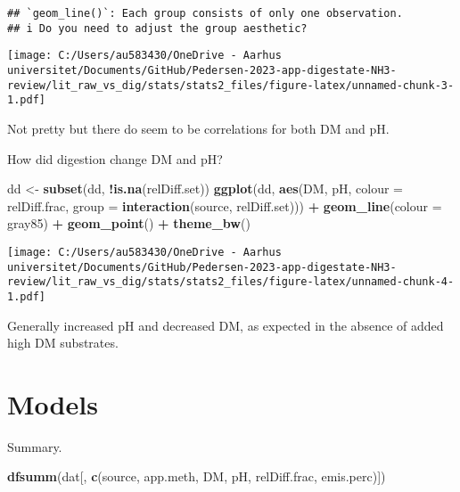 \documentclass[
]{article}
\newenvironment{Shaded}{\begin{snugshade}}{\end{snugshade}}
\newcommand{\AttributeTok}[1]{\textcolor[rgb]{0.13,0.29,0.53}{#1}}
\newcommand{\FunctionTok}[1]{\textcolor[rgb]{0.13,0.29,0.53}{\textbf{#1}}}
\newcommand{\NormalTok}[1]{#1}
\newcommand{\OtherTok}[1]{\textcolor[rgb]{0.56,0.35,0.01}{#1}}
\newcommand{\SpecialCharTok}[1]{\textcolor[rgb]{0.81,0.36,0.00}{\textbf{#1}}}
\newcommand{\StringTok}[1]{\textcolor[rgb]{0.31,0.60,0.02}{#1}}
\begin{document}
\begin{verbatim}
## `geom_line()`: Each group consists of only one observation.
## i Do you need to adjust the group aesthetic?
\end{verbatim}

\texttt{[image: C:/Users/au583430/OneDrive - Aarhus universitet/Documents/GitHub/Pedersen-2023-app-digestate-NH3-review/lit\_raw\_vs\_dig/stats/stats2\_files/figure-latex/unnamed-chunk-3-1.pdf]}

Not pretty but there do seem to be correlations for both DM and pH.

How did digestion change DM and pH?

\begin{Shaded}
\begin{Highlighting}[]
\NormalTok{dd }\OtherTok{\textless{}{-}} \FunctionTok{subset}\NormalTok{(dd, }\SpecialCharTok{!}\FunctionTok{is.na}\NormalTok{(relDiff.set))}
\FunctionTok{ggplot}\NormalTok{(dd, }\FunctionTok{aes}\NormalTok{(DM, pH, }\AttributeTok{colour =}\NormalTok{ relDiff.frac, }\AttributeTok{group =} \FunctionTok{interaction}\NormalTok{(source, relDiff.set))) }\SpecialCharTok{+}
  \FunctionTok{geom\_line}\NormalTok{(}\AttributeTok{colour =} \StringTok{\textquotesingle{}gray85\textquotesingle{}}\NormalTok{) }\SpecialCharTok{+}
  \FunctionTok{geom\_point}\NormalTok{() }\SpecialCharTok{+}
  \FunctionTok{theme\_bw}\NormalTok{()}
\end{Highlighting}
\end{Shaded}

\texttt{[image: C:/Users/au583430/OneDrive - Aarhus universitet/Documents/GitHub/Pedersen-2023-app-digestate-NH3-review/lit\_raw\_vs\_dig/stats/stats2\_files/figure-latex/unnamed-chunk-4-1.pdf]}

Generally increased pH and decreased DM, as expected in the absence of
added high DM substrates.

\hypertarget{models}{%
\section{Models}\label{models}}

Summary.

\begin{Shaded}
\begin{Highlighting}[]
\FunctionTok{dfsumm}\NormalTok{(dat[, }\FunctionTok{c}\NormalTok{(}\StringTok{\textquotesingle{}source\textquotesingle{}}\NormalTok{, }\StringTok{\textquotesingle{}app.meth\textquotesingle{}}\NormalTok{, }\StringTok{\textquotesingle{}DM\textquotesingle{}}\NormalTok{, }\StringTok{\textquotesingle{}pH\textquotesingle{}}\NormalTok{, }\StringTok{\textquotesingle{}relDiff.frac\textquotesingle{}}\NormalTok{, }\StringTok{\textquotesingle{}emis.perc\textquotesingle{}}\NormalTok{)])}
\end{Highlighting}
\end{Shaded}
\end{document}
